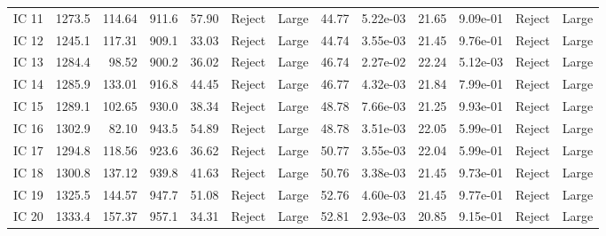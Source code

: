 \begin{tabular}{lrrrrllrrrrll}
 IC 11 &             1273.5 &  114.64 &               911.6 &  57.90 &  Reject &       Large &                    44.77 &  5.22e-03 &                     21.65 &  9.09e-01 &  Reject &       Large \\
 IC 12 &             1245.1 &  117.31 &               909.1 &  33.03 &  Reject &       Large &                    44.74 &  3.55e-03 &                     21.45 &  9.76e-01 &  Reject &       Large \\
 IC 13 &             1284.4 &   98.52 &               900.2 &  36.02 &  Reject &       Large &                    46.74 &  2.27e-02 &                     22.24 &  5.12e-03 &  Reject &       Large \\
 IC 14 &             1285.9 &  133.01 &               916.8 &  44.45 &  Reject &       Large &                    46.77 &  4.32e-03 &                     21.84 &  7.99e-01 &  Reject &       Large \\
 IC 15 &             1289.1 &  102.65 &               930.0 &  38.34 &  Reject &       Large &                    48.78 &  7.66e-03 &                     21.25 &  9.93e-01 &  Reject &       Large \\
 IC 16 &             1302.9 &   82.10 &               943.5 &  54.89 &  Reject &       Large &                    48.78 &  3.51e-03 &                     22.05 &  5.99e-01 &  Reject &       Large \\
 IC 17 &             1294.8 &  118.56 &               923.6 &  36.62 &  Reject &       Large &                    50.77 &  3.55e-03 &                     22.04 &  5.99e-01 &  Reject &       Large \\
 IC 18 &             1300.8 &  137.12 &               939.8 &  41.63 &  Reject &       Large &                    50.76 &  3.38e-03 &                     21.45 &  9.73e-01 &  Reject &       Large \\
 IC 19 &             1325.5 &  144.57 &               947.7 &  51.08 &  Reject &       Large &                    52.76 &  4.60e-03 &                     21.45 &  9.77e-01 &  Reject &       Large \\
 IC 20 &             1333.4 &  157.37 &               957.1 &  34.31 &  Reject &       Large &                    52.81 &  2.93e-03 &                     20.85 &  9.15e-01 &  Reject &       Large \\
\bottomrule
\end{tabular}
